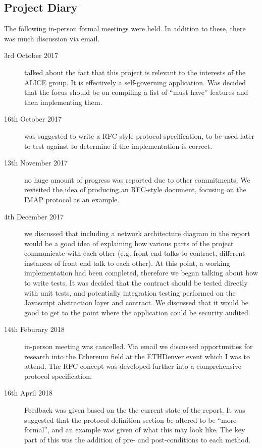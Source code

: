 \subsection*{Project Diary}

The following in-person formal meetings were held. In addition to these, there was much discussion via email.

\begin{description}
    \item [3rd October 2017] talked about the fact that this project is relevant to the interests of the ALICE group. It is effectively a self-governing application. Was decided that the focus should be on compiling a list of ``must have'' features and then implementing them.
    \item [16th October 2017] was suggested to write a RFC-style protocol specification, to be used later to test against to determine if the implementation is correct.
    \item [13th November 2017] no huge amount of progress was reported due to other commitments. We revisited the idea of producing an RFC-style document, focusing on the IMAP protocol as an example.
    \item [4th December 2017] we discussed that including a network architecture diagram in the report would be a good idea of explaining how various parts of the project communicate with each other (e.g. front end talks to contract, different instances of front end talk to each other). At this point, a working implementation had been completed, therefore we began talking about how to write tests. It was decided that the contract should be tested directly with unit tests, and potentially integration testing performed on the Javascript abstraction layer and contract. We discussed that it would be good to get to the point where the application could be security audited.
    \item [14th Feburary 2018] in-person meeting was cancelled. Via email we discussed opportunities for research into the Ethereum field at the ETHDenver event which I was to attend. The RFC concept was developed further into a comprehensive protocol specification.
    \item [16th April 2018] Feedback was given based on the the current state of the report. It was suggested that the protocol definition section be altered to be \enquote{more formal}, and an example was given of what this may look like. The key part of this was the addition of pre- and post-conditions to each method.
\end{description}
